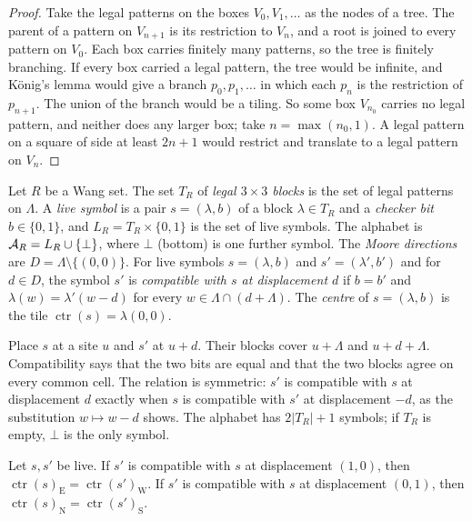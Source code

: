 \begin{proof}
Take the legal patterns on the boxes $V_0,V_1,\dots$ as the nodes of a tree. The parent of a pattern on $V_{n+1}$ is its restriction to $V_n$, and a root is joined to every pattern on $V_0$. Each box carries finitely many patterns, so the tree is finitely branching. If every box carried a legal pattern, the tree would be infinite, and K\"onig's lemma would give a branch $p_0,p_1,\dots$ in which each $p_n$ is the restriction of $p_{n+1}$. The union of the branch would be a tiling. So some box $V_{n_0}$ carries no legal pattern, and neither does any larger box; take $n=\max(n_0,1)$. A legal pattern on a square of side at least $2n+1$ would restrict and translate to a legal pattern on $V_n$.
\end{proof}

\begin{definition}\label{set:def-live}
Let $R$ be a Wang set. The set $T_R$ of \emph{legal $3\times3$ blocks} is the set of legal patterns on $\Lambda$. A \emph{live symbol} is a pair $s=(\lambda,b)$ of a block $\lambda\in T_R$ and a \emph{checker bit} $b\in\{0,1\}$, and $L_R=T_R\times\{0,1\}$ is the set of live symbols. The alphabet is $\mathcal{A}_R=L_R\cup\{\bot\}$, where $\bot$ (bottom) is one further symbol. The \emph{Moore directions} are $D=\Lambda\setminus\{(0,0)\}$. For live symbols $s=(\lambda,b)$ and $s'=(\lambda',b')$ and for $d\in D$, the symbol $s'$ is \emph{compatible with $s$ at displacement $d$} if $b=b'$ and $\lambda(w)=\lambda'(w-d)$ for every $w\in\Lambda\cap(d+\Lambda)$. The \emph{centre} of $s=(\lambda,b)$ is the tile $\operatorname{ctr}(s)=\lambda(0,0)$.
\end{definition}

Place $s$ at a site $u$ and $s'$ at $u+d$. Their blocks cover $u+\Lambda$ and $u+d+\Lambda$. Compatibility says that the two bits are equal and that the two blocks agree on every common cell. The relation is symmetric: $s'$ is compatible with $s$ at displacement $d$ exactly when $s$ is compatible with $s'$ at displacement $-d$, as the substitution $w\mapsto w-d$ shows. The alphabet has $2|T_R|+1$ symbols; if $T_R$ is empty, $\bot$ is the only symbol.

\begin{lemma}\label{set:centre}
Let $s,s'$ be live. If $s'$ is compatible with $s$ at displacement $(1,0)$, then $\operatorname{ctr}(s)_{\mathrm E}=\operatorname{ctr}(s')_{\mathrm W}$. If $s'$ is compatible with $s$ at displacement $(0,1)$, then $\operatorname{ctr}(s)_{\mathrm N}=\operatorname{ctr}(s')_{\mathrm S}$.
\end{lemma}

